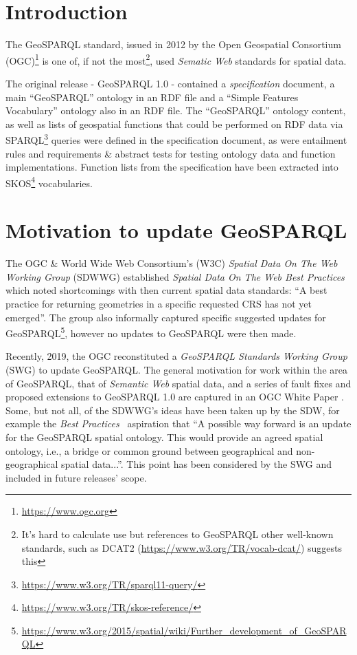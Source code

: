 \documentclass[runningheads]{llncs}
\begin{document}
\section{Introduction}\label{sec:introduction}
The GeoSPARQL standard, issued in 2012 by the Open Geospatial Consortium (OGC)\footnote{\url{https://www.ogc.org}} 
is one of, if not the most\footnote{It's hard to calculate use but references to GeoSPARQL other well-known standards, 
such as DCAT2 (\url{https://www.w3.org/TR/vocab-dcat/}) suggests this}, used \textit{Sematic Web} standards for 
spatial data.

The original release - GeoSPARQL 1.0 - contained a \textit{specification} document,
a main ``GeoSPARQL'' ontology in an RDF file and a ``Simple Features Vocabulary'' ontology also in an RDF file. The 
``GeoSPARQL'' ontology content, as well as lists of geospatial functions that could be performed on RDF data via 
SPARQL\footnote{\url{https://www.w3.org/TR/sparql11-query/}} queries were defined in the specification document, as
were entailment rules and requirements \& abstract tests for testing ontology data and function implementations. 
Function lists from the specification have been extracted into SKOS\footnote{\url{https://www.w3.org/TR/skos-reference/}}
vocabularies.


\section{Motivation to update GeoSPARQL}\label{sec:motivation}
The OGC \& World Wide Web Consortium's (W3C) \textit{Spatial Data On The Web Working Group}
(SDWWG) established \textit{Spatial Data On The Web Best Practices}\cite{van_den_brink_best_2018} which noted 
shortcomings with then current spatial data standards: ``A best practice for returning geometries in a 
specific requested CRS has not yet emerged''. The group also informally captured specific suggested updates for 
GeoSPARQL\footnote{\url{https://www.w3.org/2015/spatial/wiki/Further_development_of_GeoSPARQL}}, however no updates 
to GeoSPARQL were then made.

Recently, 2019, the OGC reconstituted a \textit{GeoSPARQL Standards Working Group} (SWG) to update GeoSPARQL. The general 
motivation for work within the area of GeoSPARQL, that of \textit{Semantic Web} spatial data, and a series of
fault fixes and proposed extensions to GeoSPARQL 1.0 are captured in an OGC White Paper \cite{geosparqlwhitepaper}. Some,
but not all, of the SDWWG's ideas have been taken up by the SDW, for example the \textit{Best Practices}~\cite{van_den_brink_best_2018}
aspiration that ``A possible way forward is an update for the GeoSPARQL spatial ontology. This would provide an 
agreed spatial ontology, i.e., a bridge or common ground between geographical and non-geographical spatial data...''.
This point has been considered by the SWG and included in future releases' scope. 
\end{document}
